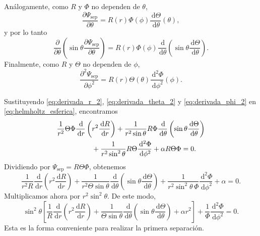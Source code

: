 \documentclass[11pt]{article}
\newcommand{\dd}{\,\mathrm{d}}
\begin{document}
Análogamente, como $R$ y $\Phi$ no dependen de $\theta$,
\begin{equation*}
\frac{\partial\Psi_{\mathrm{sep}}}{\partial\theta}
    =
    R(r)\Phi(\phi)\frac{\dd\Theta}{\dd\theta}(\theta),
\end{equation*}
y por lo tanto
\begin{equation}
\frac{\partial}{\partial\theta}
    \left(\sin\theta\frac{\partial\Psi_{\mathrm{sep}}}{\partial\theta}\right)
    =
    R(r)\Phi(\phi)
    \frac{\dd}{\dd\theta}
    \left(\sin\theta\frac{\dd\Theta}{\dd\theta}\right).
    \label{eq:derivada_theta_2}
\end{equation}
Finalmente, como $R$ y $\Theta$ no dependen de $\phi$,
\begin{equation}
\frac{\partial^2\Psi_{\mathrm{sep}}}{\partial\phi^2}
    =
    R(r)\Theta(\theta)\frac{\dd^2\Phi}{\dd\phi^2}(\phi).
    \label{eq:derivada_phi_2}
\end{equation}

Sustituyendo \eqref{eq:derivada_r_2}, \eqref{eq:derivada_theta_2} y \eqref{eq:derivada_phi_2} en \eqref{eq:helmholtz_esferica}, encontramos
\begin{align*}
&\frac{1}{r^2}\Theta\Phi
    \frac{\dd}{\dd r}\left(r^2\frac{\dd R}{\dd r}\right)
    +
    \frac{1}{r^2\sin\theta}R\Phi
    \frac{\dd}{\dd\theta}\left(\sin\theta\frac{\dd\Theta}{\dd\theta}\right)
    \notag\\
    &\hspace{5em}
    +
    \frac{1}{r^2\sin^2\theta}R\Theta
    \frac{\dd^2\Phi}{\dd\phi^2}
    +
    \alpha R\Theta\Phi=0.
\end{align*}
Dividiendo por $\Psi_{\mathrm{sep}}=R\Theta\Phi$, obtenemos
\begin{equation*}
\frac{1}{r^2R}\frac{\dd}{\dd r}\left(r^2\frac{\dd R}{\dd r}\right)
    +
    \frac{1}{r^2\Theta\sin\theta}
    \frac{\dd}{\dd\theta}\left(\sin\theta\frac{\dd\Theta}{\dd\theta}\right)
    +
    \frac{1}{r^2\sin^2\theta\,\Phi}\frac{\dd^2\Phi}{\dd\phi^2}
    +\alpha=0.
\end{equation*}
Multiplicamos ahora por $r^2\sin^2\theta$. De este modo,
\begin{equation}
\sin^2\theta
    \left[
    \frac{1}{R}\frac{\dd}{\dd r}\left(r^2\frac{\dd R}{\dd r}\right)
    +
    \frac{1}{\Theta\sin\theta}
    \frac{\dd}{\dd\theta}\left(\sin\theta\frac{\dd\Theta}{\dd\theta}\right)
    +
    \alpha r^2
    \right]
    +
    \frac{1}{\Phi}\frac{\dd^2\Phi}{\dd\phi^2}=0.
    \label{eq:helmholtz_forma_separable}
\end{equation}
Esta es la forma conveniente para realizar la primera separación.
\end{document}
